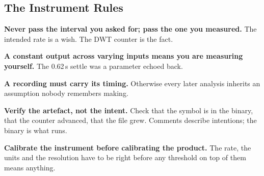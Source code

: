 \subsection{The Instrument Rules}

\begin{keytakeaways}
    \item \textbf{Never pass the interval you asked for; pass the one you measured.} The
          intended rate is a wish. The DWT counter is the fact.
    \item \textbf{A constant output across varying inputs means you are measuring yourself.}
          The 0.62\,s settle was a parameter echoed back.
    \item \textbf{A recording must carry its timing.} Otherwise every later analysis inherits
          an assumption nobody remembers making.
    \item \textbf{Verify the artefact, not the intent.} Check that the symbol is in the binary,
          that the counter advanced, that the file grew. Comments describe intentions; the
          binary is what runs.
    \item \textbf{Calibrate the instrument before calibrating the product.} The rate, the
          units and the resolution have to be right before any threshold on top of them means
          anything.
\end{keytakeaways}
